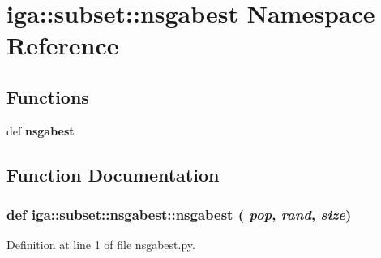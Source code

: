 \section{iga::subset::nsgabest Namespace Reference}
\label{namespaceiga_1_1subset_1_1nsgabest}


\subsection*{Functions}
\begin{CompactItemize}
\item 
def {\bf nsgabest}
\end{CompactItemize}


\subsection{Function Documentation}
\subsubsection{\setlength{\rightskip}{0pt plus 5cm}def iga::subset::nsgabest::nsgabest ( {\em pop},  {\em rand},  {\em size})}\label{namespaceiga_1_1subset_1_1nsgabest_6dca51b3f0f0458f69872ef91a790f2a}




Definition at line 1 of file nsgabest.py.
